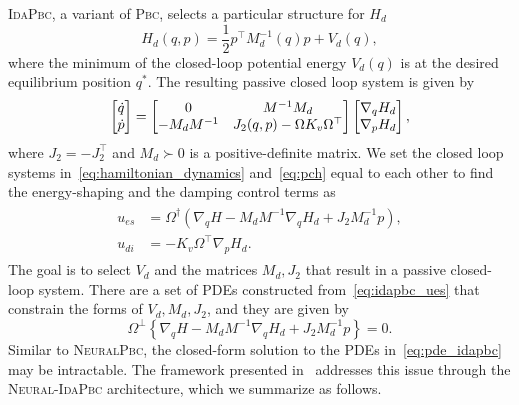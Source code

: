 \textsc{IdaPbc}, a variant of \textsc{Pbc}, selects a particular structure for
$H_d$ 
\begin{equation}
  H_d(q, p) = \frac{1}{2} p^\top M_d^{-1}(q) p + V_d(q),
  \label{eq:idapbc_desired_hamiltonian}
\end{equation}
\noindent where the minimum of the closed-loop potential energy $V_d(q)$ is at
the desired equilibrium position $q^*$.
%
The resulting passive closed loop system is given by~\cite{ortega2002stabilization}
\begin{equation}
  \begin{bmatrix}\dot{q} \\ \dot{p}\end{bmatrix}  =
  \begin{bmatrix}0 & M^{-1}M_d \\ -M_dM^{-1} & J_2(q,p) - \Omega K_v \Omega^\top\end{bmatrix}
  \begin{bmatrix}\nabla_q H_d \\ \nabla_p H_d\end{bmatrix},
  \label{eq:pch}
\end{equation}
where $J_2 = -J_2^\top$ and $M_d \succ 0$ is a positive-definite matrix.
%
We set the closed loop systems in~\eqref{eq:hamiltonian_dynamics}
and~\eqref{eq:pch} equal to each other to find the energy-shaping and the damping control terms as
\begin{align}
  \begin{split}
  u_{es} &= \Omega^{\dagger} \left(\nabla_qH - M_dM^{-1} \nabla_qH_d + J_2M_d^{-1}p\right), \\
  u_{di} &= -K_v \Omega^\top \nabla_p H_d.
  \end{split}
  \label{eq:idapbc_ues}
\end{align}
%
The goal is to select $V_d$ and the matrices $M_d, J_2$ that result in a passive
closed-loop system.
%
There are a set of PDEs constructed from~\eqref{eq:idapbc_ues} that constrain
the forms of $V_d, M_d, J_2$, and they are given by 
\begin{equation}
  \Omega^\perp \left\{ \nabla_qH - M_dM^{-1} \nabla_qH_d + J_2M_d^{-1}p \right\} = 0.
  \label{eq:pde_idapbc}
\end{equation}
%
Similar to \textsc{NeuralPbc}, the closed-form solution to the PDEs
in~\eqref{eq:pde_idapbc} may be intractable. 
%
The framework presented in~\cite{sirichotiyakul2022data} addresses this issue
through the \textsc{Neural-IdaPbc} architecture, which we summarize as follows.


